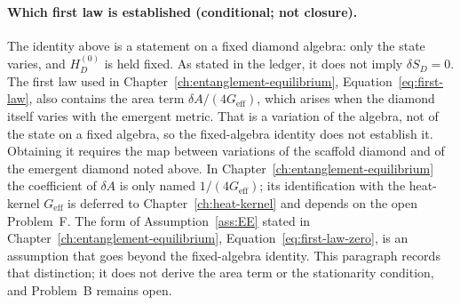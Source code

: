 \paragraph{Which first law is established (conditional; not closure).}
The identity above is a statement on a fixed diamond algebra: only
the state varies, and \(H_D^{(0)}\) is held fixed.  As stated in the
ledger, it does not imply \(\delta S_D=0\).  The first law used in
Chapter~\ref{ch:entanglement-equilibrium},
Equation~\eqref{eq:first-law}, also contains the area term
\(\delta A/(4G_{\mathrm{eff}})\), which arises when the diamond itself
varies with the emergent metric.  That is a variation of the algebra,
not of the state on a fixed algebra, so the fixed-algebra identity does
not establish it.  Obtaining it requires the map between variations of
the scaffold diamond and of the emergent diamond noted above.  In
Chapter~\ref{ch:entanglement-equilibrium} the coefficient of
\(\delta A\) is only named \(1/(4G_{\mathrm{eff}})\); its identification
with the heat-kernel \(G_{\mathrm{eff}}\) is deferred to
Chapter~\ref{ch:heat-kernel} and depends on the open Problem~F.  The
form of Assumption~\ref{ass:EE} stated in
Chapter~\ref{ch:entanglement-equilibrium},
Equation~\eqref{eq:first-law-zero}, is an assumption that goes beyond
the fixed-algebra identity.  This paragraph records that distinction;
it does not derive the area term or the stationarity condition, and
Problem~B remains open.

